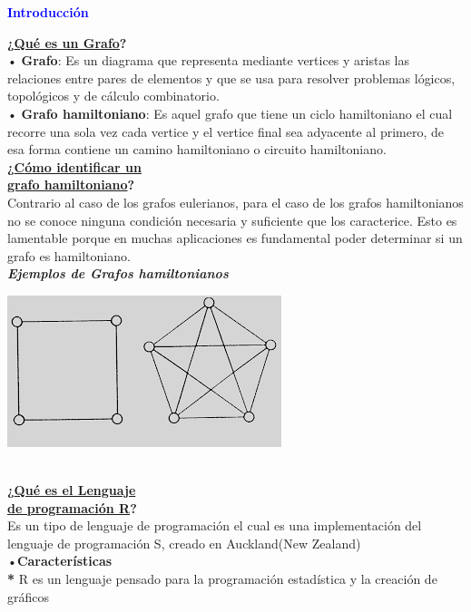 \documentclass[11pt,a4paper]{article}
\begin{document}
\begin{center}
\LARGE \textbf{\textcolor{blue}{Introducci{\'o}n}}\\[1cm]
\end{center}
\Large
\begin{multicols}{2}
\textbf{¿\underline{Qu{\'e} es un Grafo}?}\\
• \textbf{Grafo}: Es un diagrama que representa mediante vertices y aristas las relaciones entre pares de elementos y que se usa para resolver problemas l{\'o}gicos, topol{\'o}gicos y de c{\'a}lculo combinatorio.\\
• \textbf{Grafo hamiltoniano}: Es aquel grafo que tiene un ciclo hamiltoniano el cual recorre una sola vez cada vertice y el vertice final sea adyacente al primero, de esa forma contiene un camino hamiltoniano o circuito hamiltoniano.\\
\textbf{¿\underline{C{\'o}mo identificar un}}\\
\textbf{\underline{grafo hamiltoniano}?}\\
Contrario al caso de los grafos eulerianos, para el caso de los grafos hamiltonianos no se conoce ninguna condici{\'o}n necesaria y suficiente que los caracterice. Esto es lamentable porque en muchas aplicaciones es fundamental poder determinar si un grafo es hamiltoniano.\\
\textit{\textbf{Ejemplos de Grafos hamiltonianos}}\\
\begin{minipage}[c]{4cm}
\includegraphics[scale=0.42]{grafo.PNG}
\end{minipage}\\[1cm]
\textbf{¿\underline{Qu{\'e} es el Lenguaje}}\\
\textbf{\underline{de programaci{\'o}n R}?}\\
Es un tipo de lenguaje de programaci{\'o}n el cual es una implementaci{\'o}n del lenguaje de programaci{\'o}n S, creado en Auckland(New Zealand)\\
•\textbf{Caracter{\'i}sticas}\\
\textbf{*} R es un lenguaje pensado para la programaci{\'o}n estad{\'i}stica y la creaci{\'o}n de gr{\'a}ficos\\

\end{multicols}
\end{document}
